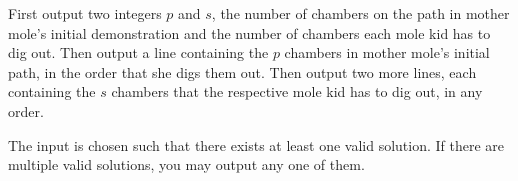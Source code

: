 \begin{Output}
First output two integers $p$ and $s$, the number of chambers on the path in
mother mole's initial demonstration and the number of chambers each mole
kid has to dig out. Then output a line containing the $p$ chambers in
mother mole's initial path, in the order that she digs them out. Then
output two more lines, each containing the $s$ chambers that the respective
mole kid has to dig out, in any order.

The input is chosen such that there exists at least one valid solution.
If there are multiple valid solutions, you may output any one of them.
\end{Output}
